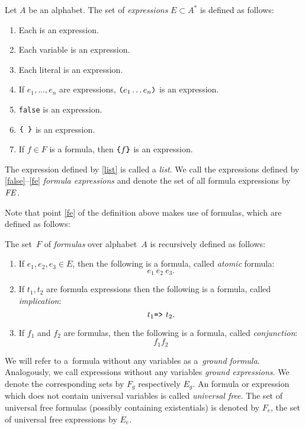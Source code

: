 \begin{definition}[Expressions]\label{expression}
  Let $A$ be an \nthree alphabet.
  The set of \textit{expressions} $E \subset A^{*}$ is
  defined as follows:
  \begin{enumerate}
    \item Each \uri is an expression.
    \item Each variable is an expression.
    \item Each literal is an expression.
    \item \label{list} If $e_1,\ldots,e_n$ are expressions, $\verb!(!e_1 \ldots e_n\verb!)!$ is an expression. 
    \item \label{false} \verb!false! is an expression.
    \item $\verb!{ }!$ is an expression.
    \item \label{fe} If $f\in F$ is a formula, then $\verb!{!f\verb!}!$ is an expression. 
  \end{enumerate}
  The expression defined by \ref{list} is called a \textit{list}.
  We call the expressions defined by \ref{false}--\ref{fe}
  \textit{formula expressions} and denote the set of all formula expressions by $\mbox{\textit{FE}}$.
\end{definition}


Note that point \ref{fe} of the definition above makes use of formulas, which are defined as follows:

\begin{definition}
    \label{formula}
    The set~$F$ of \textit{\nthree formulas} over alphabet~$A$ is recursively defined as follows:
    \begin{enumerate}  
      \item \label{1} If $e_1, e_2, e_3 \in E$, then the following is a formula, called \textit{atomic} formula: \[e_1~ e_2~ e_3.\] 
      \item \label{2} If $t_1, t_2$ are formula expressions then the following is a formula, called \mbox{\textit{implication}}: \[t_{1} \verb!=>!~t_{2}.\] 
      \item \label{n} If $f_1$ and $f_2$ are formulas, then the following is a formula, called \textit{conjunction}: \[f_1 f_2\] 
    \end{enumerate}
\end{definition}

We will refer to a~formula without any variables as a~\textit{ground formula}.
Analogously, we call expressions without any variables \textit{ground expressions}.
We denote the corresponding sets by $F_g$ respectively $E_g$. 
An formula or expression which does not contain universal variables is called \emph{universal free}. 
The set of universal free formulas (possibly containing existentials) is denoted by $F_e$, the set of universal free expressions by $E_e$.

